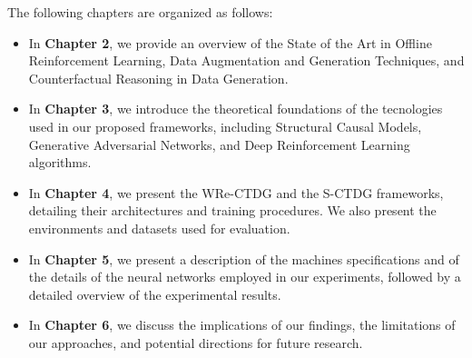 The following chapters are organized as follows:
\begin{itemize}
    \item In \textbf{Chapter 2}, we provide an overview of the State of the Art
    in Offline Reinforcement Learning, Data Augmentation and Generation Techniques,
    and Counterfactual Reasoning in Data Generation.
    \item In \textbf{Chapter 3}, we introduce the theoretical foundations
    of the tecnologies used in our proposed frameworks,
    including Structural Causal Models,
    Generative Adversarial Networks,
    and Deep Reinforcement Learning algorithms.
    \item In \textbf{Chapter 4}, we present the WRe-CTDG
    and the S-CTDG frameworks,
    detailing their architectures and training procedures.
    We also present the environments and datasets used for evaluation.
    \item In \textbf{Chapter 5}, we present a description
    of the machines specifications
    and of the details of the neural networks employed in our experiments,
    followed by a detailed overview of the experimental results.
    \item In \textbf{Chapter 6}, we discuss the implications of our findings,
    the limitations of our approaches,
    and potential directions for future research.
\end{itemize}